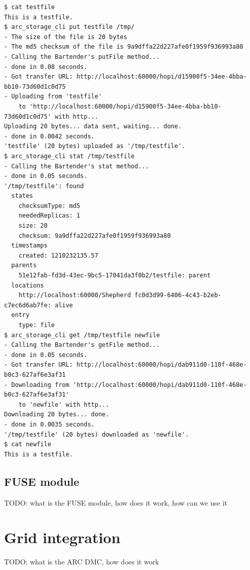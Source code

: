 \documentclass{book}
\begin{document}
\begin{verbatim}
$ cat testfile 
This is a testfile.
$ arc_storage_cli put testfile /tmp/
- The size of the file is 20 bytes
- The md5 checksum of the file is 9a9dffa22d227afe0f1959f936993a80
- Calling the Bartender's putFile method...
- done in 0.08 seconds.
- Got transfer URL: http://localhost:60000/hopi/d15900f5-34ee-4bba-bb10-73d60d1c0d75
- Uploading from 'testfile'
    to 'http://localhost:60000/hopi/d15900f5-34ee-4bba-bb10-73d60d1c0d75' with http...
Uploading 20 bytes... data sent, waiting... done.
- done in 0.0042 seconds.
'testfile' (20 bytes) uploaded as '/tmp/testfile'.
$ arc_storage_cli stat /tmp/testfile
- Calling the Bartender's stat method...
- done in 0.05 seconds.
'/tmp/testfile': found
  states
    checksumType: md5
    neededReplicas: 1
    size: 20
    checksum: 9a9dffa22d227afe0f1959f936993a80
  timestamps
    created: 1210232135.57
  parents
    51e12fab-fd3d-43ec-9bc5-17041da3f0b2/testfile: parent
  locations
    http://localhost:60000/Shepherd fc0d3d99-6406-4c43-b2eb-c7ec6d6ab7fe: alive
  entry
    type: file
$ arc_storage_cli get /tmp/testfile newfile
- Calling the Bartender's getFile method...
- done in 0.05 seconds.
- Got transfer URL: http://localhost:60000/hopi/dab911d0-110f-468e-b0c3-627af6e3af31
- Downloading from 'http://localhost:60000/hopi/dab911d0-110f-468e-b0c3-627af6e3af31'
    to 'newfile' with http...
Downloading 20 bytes... done.
- done in 0.0035 seconds.
'/tmp/testfile' (20 bytes) downloaded as 'newfile'.
$ cat newfile 
This is a testfile.
\end{verbatim}


\subsection{FUSE module} %
\label{sub:fuse_module}

TODO: what is the FUSE module, how does it work, how can we use it



\section{Grid integration} %
\label{sec:grid_integration}

TODO: what is the ARC DMC, how does it work



% 
\end{document}
